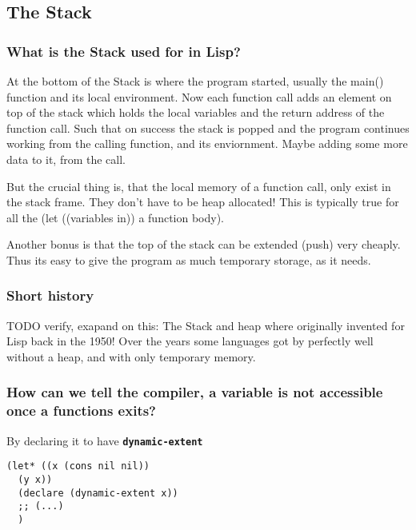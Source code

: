 \documentclass[11pt]{article}
\begin{document}
\subsection{The Stack}
\label{sec:org7d0f9ac}

\subsubsection{What is the Stack used for in Lisp?}
\label{sec:orgc513d93}
At the bottom of the Stack is where the program started, usually the main() function
and its local environment. Now each function call adds an element on top of the stack
which holds the local variables and the return address of the function call. Such that
on success the stack is popped and the program continues working from the calling
function, and its enviornment. Maybe adding some more data to it, from the call.

But the crucial thing is, that the local memory of a function call, only exist in the
stack frame. They don't have to be heap allocated!  This is typically true for all the 
(let ((variables in)) a function body).

Another bonus is that the top of the stack can be extended (push) very cheaply. Thus
its easy to give the program as much temporary storage, as it needs.

\subsubsection{Short history}
\label{sec:orgbe4426f}
TODO verify, exapand on this: The Stack and heap where originally invented for Lisp
back in the 1950!  Over the years some languages got by perfectly well without a heap,
and with only temporary memory.

\subsubsection{How can we tell the compiler, a variable is not accessible once a functions exits?}
\label{sec:org896e02b}
By declaring it to have \textbf{\texttt{dynamic-extent}}
\begin{verbatim}
(let* ((x (cons nil nil))
  (y x))
  (declare (dynamic-extent x))
  ;; (...)
  )
\end{verbatim}
\end{document}
